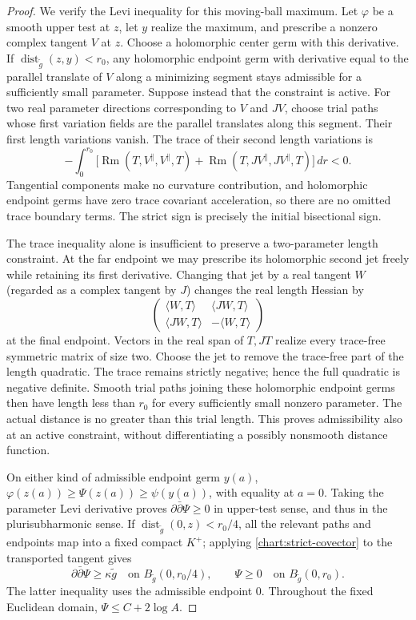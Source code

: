 \documentclass[11pt]{article}
\theoremstyle{definition}
\theoremstyle{remark}
\newcommand{\dd}{\partial\bar\partial}
\DeclareMathOperator{\Rm}{Rm}
\DeclareMathOperator{\dist}{dist}
\numberwithin{equation}{section}
\begin{document}
\begin{proof}
We verify the Levi inequality for this moving-ball maximum.
Let $\varphi$ be a smooth upper test at $z$, let $y$ realize the
maximum, and prescribe a nonzero complex tangent $V$ at $z$.
Choose a holomorphic center germ with this derivative.  If
$\dist_{\widetilde g}(z,y)<r_0$, any holomorphic endpoint germ
with derivative equal to the parallel translate of $V$ along a
minimizing segment stays admissible for a sufficiently small
parameter.  Suppose instead that the constraint is active.
For two real parameter directions corresponding to $V$ and $JV$,
choose trial paths whose first variation fields are the parallel
translates along this segment.  Their first length variations
vanish.  The trace of their second length variations is
\[
 -\int_0^{r_0}
 \bigl[\Rm(T,V^{\parallel},V^{\parallel},T)
       +\Rm(T,JV^{\parallel},JV^{\parallel},T)\bigr]\,dr<0.
\]
Tangential components make no curvature contribution, and
holomorphic endpoint germs have zero trace covariant
acceleration, so there are no omitted trace boundary terms.
The strict sign is precisely the initial bisectional sign.

The trace inequality alone is insufficient to preserve a
two-parameter length constraint.  At the far endpoint we may
prescribe its holomorphic second jet freely while retaining
its first derivative.  Changing that jet by a real tangent $W$
(regarded as a complex tangent by $J$) changes the real length
Hessian by
\[
 \begin{pmatrix}
 \langle W,T\rangle&\langle JW,T\rangle\\
 \langle JW,T\rangle&-\langle W,T\rangle
 \end{pmatrix}
\]
at the final endpoint.  Vectors in the real span of $T,JT$
realize every trace-free symmetric matrix of size two.
Choose the jet to remove the trace-free part of the length
quadratic.  The trace remains
strictly negative; hence the full quadratic is negative definite.
Smooth trial paths joining these holomorphic endpoint germs
then have length less than $r_0$ for every sufficiently small
nonzero parameter.  The actual distance is no greater than this
trial length.  This proves admissibility also at an active
constraint, without differentiating a possibly nonsmooth
distance function.

On either kind of admissible endpoint germ $y(a)$,
$\varphi(z(a))\ge\Psi(z(a))\ge\psi(y(a))$, with equality at
$a=0$.  Taking the parameter Levi derivative proves
$\dd\Psi\ge0$ in upper-test sense, and thus in the
plurisubharmonic sense.  If
$\dist_{\widetilde g}(0,z)<r_0/4$, all the relevant paths and
endpoints map into a fixed compact $K^+$; applying
\eqref{chart:strict-covector} to the transported tangent gives
\begin{equation}\label{chart:strict-envelope}
 \dd\Psi\ge\kappa\widetilde g
 \quad\text{on }B_{\widetilde g}(0,r_0/4),
 \qquad \Psi\ge0\quad\text{on }B_{\widetilde g}(0,r_0).
\end{equation}
The latter inequality uses the admissible endpoint $0$.
Throughout the fixed Euclidean domain,
$\Psi\le C+2\log A$.


\end{proof}
\end{document}
